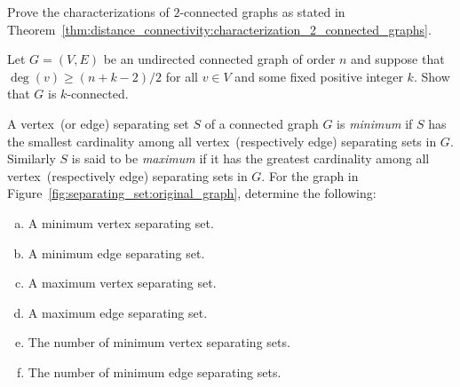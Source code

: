 \begin{problem}
\item Prove the characterizations of $2$-connected graphs as stated in
  Theorem~\ref{thm:distance_connectivity:characterization_2_connected_graphs}.

\item Let $G = (V,E)$ be an undirected connected graph of order $n$
  and suppose that $\deg(v) \geq (n + k - 2) / 2$ for all $v \in V$
  and some fixed positive integer $k$. Show that $G$ is
  $k$-connected.

\item A vertex~(or edge) separating set $S$ of a connected graph $G$
  is \emph{minimum} if $S$ has the smallest cardinality among all
  vertex~(respectively edge) separating sets in $G$. Similarly $S$ is
  said to be \emph{maximum} if it has the greatest cardinality among
  all vertex~(respectively edge) separating sets in $G$. For the graph
  in Figure~\ref{fig:separating_set:original_graph}, determine the
  following:
  \begin{enumerate}[(a)]
  \item A minimum vertex separating set.

  \item A minimum edge separating set.

  \item A maximum vertex separating set.

  \item A maximum edge separating set.

  \item The number of minimum vertex separating sets.

  \item The number of minimum edge separating sets.
  \end{enumerate}
\end{problem}
